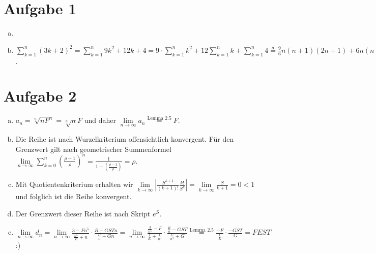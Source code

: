 \documentclass{article}
\begin{document}
    \section*{Aufgabe 1}
    \begin{enumerate}[(a)]
        \item {}
        \item $\sum_{k = 1}^{n}(3k+2)^2 = \sum_{k = 1}^{n} 9k^2 + 12 k + 4 = 9 \cdot \sum_{k = 1}^{n}k^2 + 12 \sum_{k = 1}^{n}k + \sum_{k = 1}^{n}4 \overset{a}{=} \frac{9}{6}n(n+1)(2n+1) + 6 n(n+1) + 4n$.
    \end{enumerate}
    \section*{Aufgabe 2}
    \begin{enumerate}[(a)]
        \item $a_n = \sqrt[n]{nF^n} = \sqrt[n]{n} F$ und daher $\lim\limits_{n\to\infty} a_n \overset{\text{Lemma 2.5}}{=} F$.
        \item Die Reihe ist nach Wurzelkriterium offensichtlich konvergent. Für den Grenzwert gilt nach geometrischer Summenformel $\lim\limits_{n\to\infty} \sum_{k = 0}^{n}\left(\frac{\rho-1}{\rho}\right)^n = \frac{1}{1-\left(\frac{\rho-1}{\rho}\right)} = \rho$.
        \item Mit Quotientenkriterium erhalten wir $\lim\limits_{k\to\infty} \left|\frac{S^{k+1}}{(k+1)!}\frac{k!}{S^k}\right| = \lim\limits_{k\to\infty} \frac{S}{k+1} = 0 < 1$ und folglich ist die Reihe konvergent.
        \item Der Grenzwert dieser Reihe ist nach Skript $e^S$.
        \item $\lim\limits_{n\to\infty}d_n = \lim\limits_{n\to\infty} \frac{3-Fn^5}{\frac{n^5}{E}+n}\cdot \frac{R-GSTn}{\frac{U}{n}+Gn} = \lim\limits_{n\to\infty} \frac{\frac{3}{n^5}-F}{\frac{1}{E}+\frac{1}{n^4}}\cdot \frac{\frac{R}{n}-GST}{\frac{U}{n^2}+G} \overset{\text{Lemma 2.5}}{=} \frac{-F}{\frac{1}{E}}\cdot \frac{-GST}{G} = FEST$ :)
    \end{enumerate}
\end{document}
